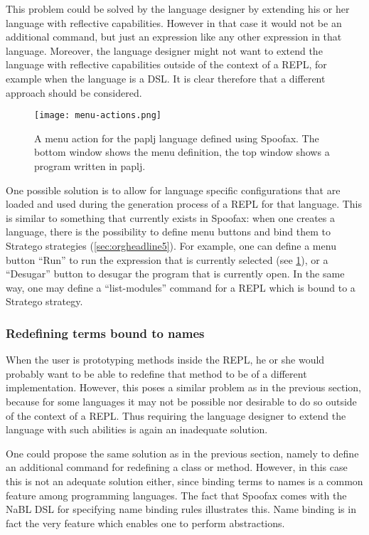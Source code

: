 This problem could be solved by the language designer by extending his
or her language with reflective capabilities. However in that case it
would not be an additional command, but just an expression like any
other expression in that language. Moreover, the language designer
might not want to extend the language with reflective capabilities
outside of the context of a REPL, for example when the language is a
DSL. It is clear therefore that a different approach should be
considered.

\begin{figure}[htbp]
  \centering
  \texttt{[image: menu-actions.png]}
  \caption{A menu action for the paplj language defined using
    Spoofax. The bottom window shows the menu definition, the top
    window shows a program written in paplj.}
  \label{fig:menu-actions}
\end{figure}

One possible solution is to allow for language specific configurations
that are loaded and used during the generation process of a REPL for
that language. This is similar to something that currently exists in
Spoofax: when one creates a language, there is the possibility to
define menu buttons and bind them to Stratego strategies
(\cref{sec:orgheadline5}). For example, one can define a menu button
``Run'' to run the expression that is currently selected (see
\cref{fig:menu-actions}), or a ``Desugar'' button to desugar the
program that is currently open. In the same way, one may define a
``list-modules'' command for a REPL which is bound to a Stratego
strategy.

\subsubsection{Redefining terms bound to names}
\label{sec:redef-cont-bound}
When the user is prototyping methods inside the REPL, he or she would
probably want to be able to redefine that method to be of a different
implementation. However, this poses a similar problem as in the
previous section, because for some languages it may not be possible
nor desirable to do so outside of the context of a REPL. Thus
requiring the language designer to extend the language with such
abilities is again an inadequate solution.

One could propose the same solution as in the previous section, namely
to define an additional command for redefining a class or
method. However, in this case this is not an adequate solution either,
since binding terms to names is a common feature among programming
languages. The fact that Spoofax comes with the NaBL DSL for
specifying name binding rules illustrates this. Name binding is in
fact the very feature which enables one to perform abstractions.

